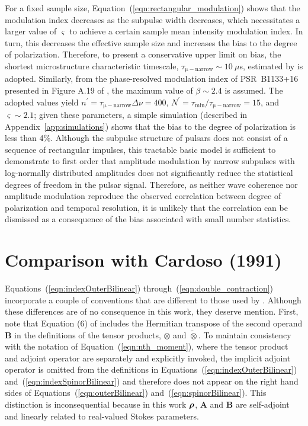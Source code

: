 \documentclass[twocolumn]{aastex6}
\newcommand{\mbf}[1]{\mbox{\boldmath $#1$}}
\newcommand{\Eqn}[1]{Equation~(\ref{eqn:#1})}
\newcommand{\Eqns}[3]{Equations~(\ref{eqn:#1}) #2~(\ref{eqn:#3})}
\newcommand{\App}[1]{Appendix~\ref{app:#1}}
\newcommand{\stimes}{\ensuremath{\tilde{\otimes}}}
\begin{document}
{\begin{appendix}
For a fixed sample size, \Eqn{rectangular_modulation} shows that the modulation
index decreases as the subpulse width decreases, which necessitates a
larger value of $\varsigma$ to achieve a certain sample mean intensity
modulation index.
%
In turn, this decreases the effective sample size and increases the
bias to the degree of polarization.
%
Therefore, to present a conservative upper limit on
bias, the shortest microstructure characteristic timescale,
$\tau_\mathrm{\mu-narrow}\sim 10~\mu$s, estimated by \cite{pbc+02} is adopted.
%
Similarly, from the phase-resolved modulation index of PSR~B1133+16
presented in Figure A.19 of \cite{wes06}, the maximum value of
$\beta\sim2.4$ is assumed.
%
The adopted values yield $n^\prime=\tau_\mathrm{\mu-narrow}\Delta\nu=400$,
$N^\prime=\tau_\mathrm{min}/\tau_\mathrm{\mu-narrow}=15$,
and $\varsigma\sim2.1$;
%
given these parameters, a simple simulation (described in
\App{simulations}) shows that the bias to the degree of polarization is
less than 4\%.
%
%
%
Although the subpulse structure of pulsars does not consist of a
sequence of rectangular impulses, this tractable basic model is
sufficient to demonstrate to first order that amplitude modulation by
narrow subpulses with log-normally distributed amplitudes does not
significantly reduce the statistical degrees of freedom in the pulsar
signal.
%
Therefore, as neither wave coherence nor amplitude modulation reproduce the
observed correlation between degree of polarization and temporal
resolution, it is unlikely that the correlation can be dismissed as a
consequence of the bias associated with small number statistics.


\section{Comparison with Cardoso (1991)}
\label{app:comparison_with_car91}

\Eqns{indexOuterBilinear}{through}{double_contraction} incorporate a
couple of conventions that are different to those used by
\cite{car91}.
%
Although these differences are of no consequence in this work, they
deserve mention.
%
First, note that Equation (6) of \cite{car91} includes the Hermitian
transpose of the second operand {\bf B} in the definitions of the
tensor products, $\otimes$ and \stimes.
%
To maintain consistency with the notation of
\Eqn{nth_moment}, where the tensor product and adjoint operator are
separately and explicitly invoked, the implicit adjoint operator is omitted
from the definitions in \Eqns{indexOuterBilinear}{and}{indexSpinorBilinear}
and therefore does not appear on the right hand sides of
\Eqns{outerBilinear}{and}{spinorBilinear}.
%
This distinction is inconsequential because in this work $\mbf\rho$,
{\bf A} and {\bf B} are self-adjoint and linearly related to
real-valued Stokes parameters.
%


\end{appendix}}
\end{document}
